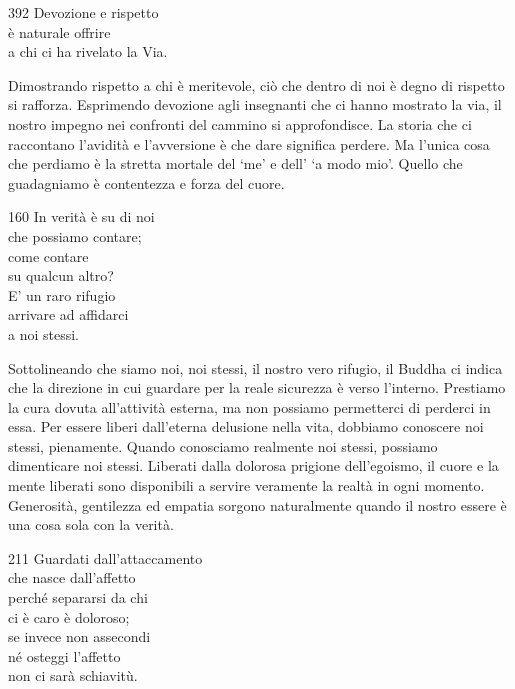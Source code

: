 
\begin{dhpVerse}{392}
\label{dhp-392}
Devozione e rispetto\\
\`{e} naturale offrire\\
a chi ci ha rivelato la Via.
\end{dhpVerse}

\begin{dhpRefl}
Dimostrando rispetto a chi \`{e} meritevole, ci\`{o} che dentro di noi \`{e} degno di rispetto si rafforza. Esprimendo devozione agli insegnanti che ci hanno mostrato la via, il nostro impegno nei confronti del cammino si approfondisce. La storia che ci raccontano l'avidit\`{a} e l'avversione \`{e} che dare significa perdere. Ma l'unica cosa che perdiamo \`{e} la stretta mortale del `me' e  dell' `a modo mio'. Quello che guadagniamo \`{e} contentezza e forza del cuore.
\end{dhpRefl}


\begin{dhpVerse}{160}
\label{dhp-160}
In verit\`{a} \`{e} su di noi\\
che possiamo contare;\\
come contare\\
su qualcun altro?\\
E' un raro rifugio\\
arrivare ad affidarci\\
a noi stessi.
\end{dhpVerse}

\begin{dhpRefl}
Sottolineando che siamo noi, noi stessi, il nostro vero rifugio, il Buddha ci indica che la direzione in cui guardare per la reale sicurezza \`{e} verso l'interno. Prestiamo la cura dovuta all'attivit\`{a} esterna, ma non possiamo permetterci di perderci in essa. Per essere liberi dall'eterna delusione nella vita, dobbiamo conoscere noi stessi, pienamente. Quando conosciamo realmente noi stessi, possiamo dimenticare noi stessi. Liberati dalla dolorosa prigione dell'egoismo, il cuore e la mente liberati sono disponibili a servire veramente la realt\`{a} in ogni momento. Generosit\`{a}, gentilezza ed empatia sorgono naturalmente quando il nostro essere \`{e} una cosa sola con la verit\`{a}.
\end{dhpRefl}


\begin{dhpVerse}{211}
\label{dhp-211}
Guardati dall'attaccamento\\
che nasce dall'affetto\\
perch\'{e} separarsi da chi\\
ci \`{e} caro \`{e} doloroso;\\
se invece non assecondi\\
n\'{e} osteggi l'affetto\\
non ci sar\`{a} schiavitù.
\end{dhpVerse}


